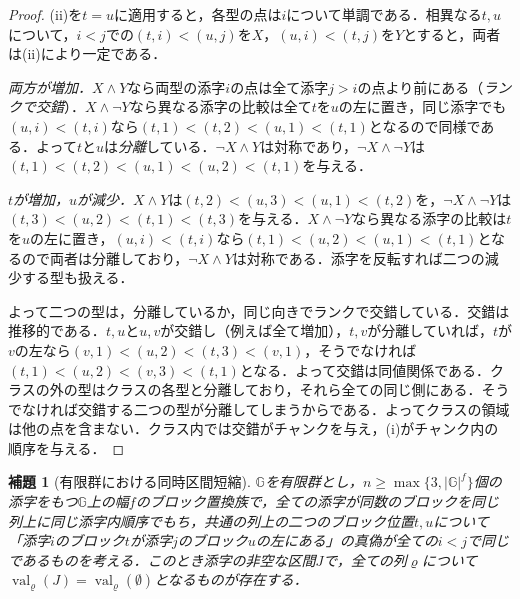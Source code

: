 \documentclass[11pt,a4paper]{ltjsarticle}
\numberwithin{equation}{section}
\theoremstyle{plain}
\newtheorem{lemma}[theorem]{補題}
\theoremstyle{definition}
\theoremstyle{remark}
\begin{document}
\begin{proof}
(ii)を$t=u$に適用すると，各型の点は$i$について単調である．相異なる$t,u$について，$i<j$での$(t,i)<(u,j)$を$X$，$(u,i)<(t,j)$を$Y$とすると，両者は(ii)により一定である．

\emph{両方が増加．}$X\wedge Y$なら両型の添字$i$の点は全て添字$j>i$の点より前にある（\emph{ランクで交錯}）．$X\wedge\neg Y$なら異なる添字の比較は全て$t$を$u$の左に置き，同じ添字でも$(u,i)<(t,i)$なら$(t,1)<(t,2)<(u,1)<(t,1)$となるので同様である．よって$t$と$u$は\emph{分離}している．$\neg X\wedge Y$は対称であり，$\neg X\wedge\neg Y$は$(t,1)<(t,2)<(u,1)<(u,2)<(t,1)$を与える．

\emph{$t$が増加，$u$が減少．}$X\wedge Y$は$(t,2)<(u,3)<(u,1)<(t,2)$を，$\neg X\wedge\neg Y$は$(t,3)<(u,2)<(t,1)<(t,3)$を与える．$X\wedge\neg Y$なら異なる添字の比較は$t$を$u$の左に置き，$(u,i)<(t,i)$なら$(t,1)<(u,2)<(u,1)<(t,1)$となるので両者は分離しており，$\neg X\wedge Y$は対称である．添字を反転すれば二つの減少する型も扱える．

よって二つの型は，分離しているか，同じ向きでランクで交錯している．交錯は推移的である．$t,u$と$u,v$が交錯し（例えば全て増加），$t,v$が分離していれば，$t$が$v$の左なら$(v,1)<(u,2)<(t,3)<(v,1)$，そうでなければ$(t,1)<(u,2)<(v,3)<(t,1)$となる．よって交錯は同値関係である．クラスの外の型はクラスの各型と分離しており，それら全ての同じ側にある．そうでなければ交錯する二つの型が分離してしまうからである．よってクラスの領域は他の点を含まない．クラス内では交錯がチャンクを与え，(i)がチャンク内の順序を与える．
\end{proof}

\begin{lemma}[有限群における同時区間短縮]
\label{lem:group-interval}
${\mathbb G}$を有限群とし，$n\ge\max\{3,|{\mathbb G}|^f\}$個の添字をもつ${\mathbb G}$上の幅$f$のブロック置換族で，全ての添字が同数のブロックを同じ列上に同じ添字内順序でもち，共通の列上の二つのブロック位置$t,u$について「添字$i$のブロック$t$が添字$j$のブロック$u$の左にある」の真偽が全ての$i<j$で同じであるものを考える．このとき添字の非空な区間$J$で，全ての列$\varrho$について$\operatorname{val}_\varrho(J)=\operatorname{val}_\varrho(\emptyset)$となるものが存在する．
\end{lemma}
\end{document}
